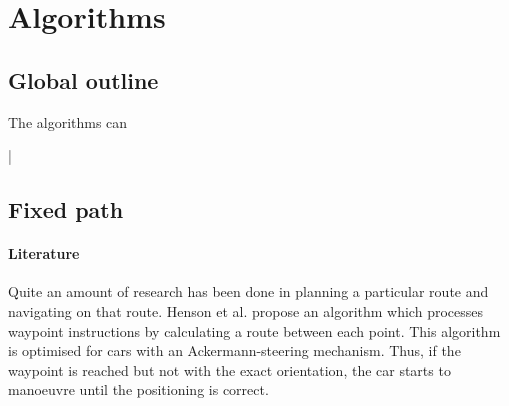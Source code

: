 \documentclass[conference,a4paper]{IEEEtran}
\begin{document}
\section{Algorithms}
\subsection{Global outline}
The algorithms can 

\newpage
|
\newpage

\subsection{Fixed path}



\paragraph{Literature} Quite an amount of research has been done in planning a particular route and navigating on that route. Henson et al. \cite{Henson2008} propose an algorithm which processes waypoint instructions by calculating a route between each point. This algorithm is optimised for cars with an Ackermann-steering mechanism. Thus, if the waypoint is reached but not with the exact orientation, the car starts to manoeuvre until the positioning is correct. 
\end{document}
